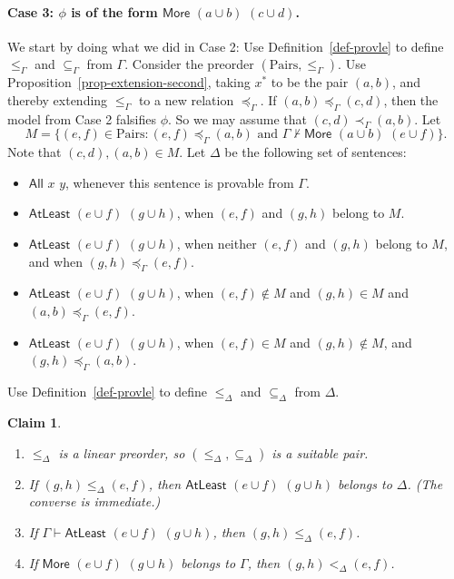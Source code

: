 \documentclass[letterpaper]{article} %
\newtheorem{claim}[theorem]{Claim}
\theoremstyle{definition}
\newcommand{\set}[1]{\{ #1 \}}
\newcommand{\proves}{\vdash}
\newcommand{\All}[2]{\mathsf{All}\,\,#1\,\,#2}
\newcommand{\Atleast}[2]{\mathsf{AtLeast}\,\,#1\,\,#2}
\newcommand{\More}[2]{\mathsf{More}\,\,#1\,\,#2}
\newcommand{\Pairs}{\mbox{Pairs}}
\newcommand{\provsub}{\subseteq_{\Gamma}}
\newcommand{\provle}{\le_{\Gamma}}
\newcommand{\provsubDelta}{\subseteq_{\Delta}}
\newcommand{\provleDelta}{\le_{\Delta}}
\newcommand{\provltDelta}{<_{\Delta}}
\newcommand{\provextended}{\preceq_{\Gamma}}
\newcommand{\provextendedstrict}{\prec_{\Gamma}}
\begin{document}
{%

 
  \paragraph{Case 3: $\phi$ is of the form $\More{(a\cup b)}{(c\cup d)}$.} 

 We start by doing what we did in Case 2:  
 Use Definition~\ref{def-provle}
to define $\provle$ and $\provsub$ from $\Gamma$.  
Consider the preorder $(\Pairs,\provle)$.   
 Use
Proposition~\ref{prop-extension-second},  taking $x^*$ to be the pair $(a,b)$, and thereby
 extending $\provle$ to a new relation $\provextended$.
If $(a,b) \provextended (c,d)$, then the model from Case 2 falsifies $\phi$.
So we may assume that $(c,d) \provextendedstrict (a,b)$.
Let 
\[ M = \set{(e,f)\in \Pairs : (e,f) \provextended (a,b) \mbox{ and } \Gamma\not\proves \More{(a\cup b)}{(e\cup f)}}.\]
Note that $(c,d), (a,b)\in M$.
Let $\Delta$ be the following set of sentences:
\begin{itemize}
\item $\All{x}{y}$, whenever this sentence is provable from $\Gamma$.
\item $\Atleast{(e\cup f)}{(g\cup h)}$, when $(e,f)$ and $(g,h)$ belong to $M$.
\item  $\Atleast{(e\cup f)}{(g\cup h)}$, when neither $(e,f)$ and $(g,h)$ belong to $M$,
and when $(g,h) \provextended (e,f)$.
\item $\Atleast{(e\cup f)}{(g\cup h)}$,  when $(e,f)\notin M$ and $(g,h)\in M$ and  $(a,b) \provextended (e,f)$.
\item $\Atleast{(e\cup f)}{(g\cup h)}$,  when $(e,f)\in M$ and $(g,h)\notin M$, and $(g,h) \provextended (a,b)$. 
\end{itemize}

Use Definition~\ref{def-provle}
to define $\provleDelta$ and $\provsubDelta$ from $\Delta$. 



\begin{claim}
\label{claimInMore}
\begin{enumerate}
\item $\provleDelta$  is a linear preorder, so $(\provleDelta,\provsubDelta)$ is a suitable pair.
\item  If  $(g,h)\provleDelta (e,f)$, then $\Atleast{(e\cup f)}{(g\cup h)}$ belongs to $\Delta$.
(The converse is immediate.)
\item If  $\Gamma\proves\Atleast{(e\cup f)}{(g\cup h)}$, then $(g,h)\provleDelta (e,f)$.
\item If  $\More{(e\cup f)}{(g\cup h)}$ belongs to $\Gamma$, then  $(g,h)\provltDelta (e,f)$.
\end{enumerate}
\end{claim}

}
\end{document}
